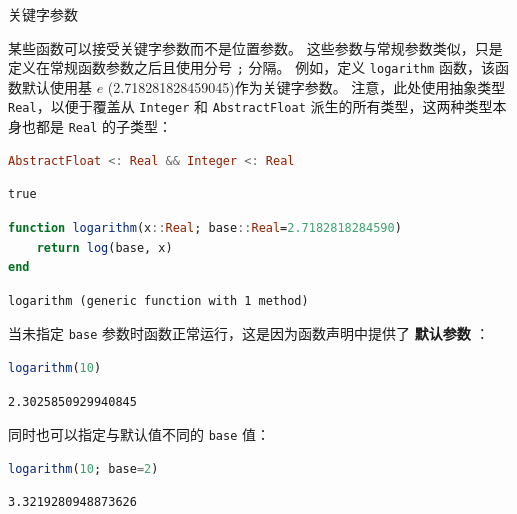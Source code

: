 \documentclass[
  notoc %
]{tufte-book}
\makeatletter
\newcommand{\passthrough}[1]{#1}
\renewcommand\subsubsection{%
\@startsection{subsubsection}{3}{\z@ }{-3.25ex\@plus -1ex \@minus -.2ex}{1.5ex \@plus .2ex}{\normalfont \normalsize \bfseries }
}
\makeatother
\begin{document}
\hypertarget{sec:function_keyword_arguments}{%
\subsubsection{关键字参数}\label{sec:function_keyword_arguments}}

某些函数可以接受关键字参数而不是位置参数。
这些参数与常规参数类似，只是定义在常规函数参数之后且使用分号
\passthrough{\lstinline!;!} 分隔。 例如，定义
\passthrough{\lstinline!logarithm!} 函数，该函数默认使用基 \(e\)
(2.718281828459045)作为关键字参数。 注意，此处使用抽象类型
\passthrough{\lstinline!Real!}，以便于覆盖从
\passthrough{\lstinline!Integer!} 和
\passthrough{\lstinline!AbstractFloat!}
派生的所有类型，这两种类型本身也都是 \passthrough{\lstinline!Real!}
的子类型：

\begin{lstlisting}[language=Julia]
AbstractFloat <: Real && Integer <: Real
\end{lstlisting}

\begin{lstlisting}[language=Output]
true
\end{lstlisting}

\begin{lstlisting}[language=Julia]
function logarithm(x::Real; base::Real=2.7182818284590)
    return log(base, x)
end
\end{lstlisting}

\begin{lstlisting}[language=Output]
logarithm (generic function with 1 method)
\end{lstlisting}

当未指定 \passthrough{\lstinline!base!}
参数时函数正常运行，这是因为函数声明中提供了 \textbf{默认参数} ：

\begin{lstlisting}[language=Julia]
logarithm(10)
\end{lstlisting}

\begin{lstlisting}[language=Output]
2.3025850929940845
\end{lstlisting}

同时也可以指定与默认值不同的 \passthrough{\lstinline!base!} 值：

\begin{lstlisting}[language=Julia]
logarithm(10; base=2)
\end{lstlisting}

\begin{lstlisting}[language=Output]
3.3219280948873626
\end{lstlisting}
\end{document}

